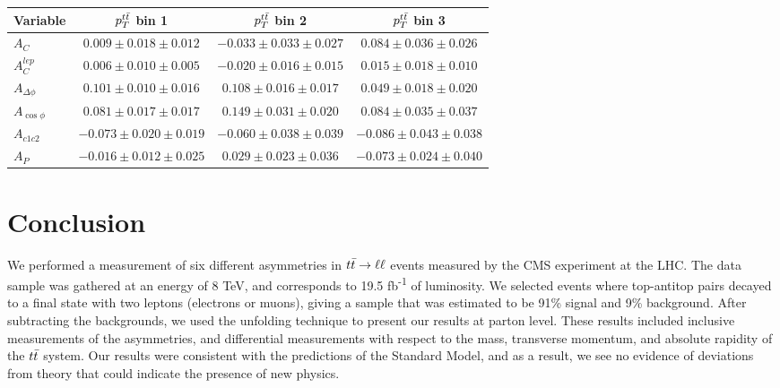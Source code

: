 \begin{table}[hbt]
\begin{center}
\begin{tabular}{l |  c  c  c }
\hline
Variable & $p_T^{t\bar{t}}$ bin 1 & $p_T^{t\bar{t}}$ bin 2 & $p_T^{t\bar{t}}$ bin 3  \\ \hline
$A_{C}$  & $0.009 \pm 0.018 \pm 0.012$   & $-0.033 \pm 0.033 \pm 0.027$   & $0.084 \pm 0.036 \pm 0.026$  \\
$A^{lep}_{C}$  & $0.006 \pm 0.010 \pm 0.005$   & $-0.020 \pm 0.016 \pm 0.015$   & $0.015 \pm 0.018 \pm 0.010$  \\
$A_{\Delta\phi}$  & $0.101 \pm 0.010 \pm 0.016$   & $0.108 \pm 0.016 \pm 0.017$   & $0.049 \pm 0.018 \pm 0.020$  \\
$A_{\cos\phi}$  & $0.081 \pm 0.017 \pm 0.017$   & $0.149 \pm 0.031 \pm 0.020$   & $0.084 \pm 0.035 \pm 0.037$  \\
$A_{c1c2}$  & $-0.073 \pm 0.020 \pm 0.019$   & $-0.060 \pm 0.038 \pm 0.039$   & $-0.086 \pm 0.043 \pm 0.038$  \\
$A_{P}$  & $-0.016 \pm 0.012 \pm 0.025$   & $0.029 \pm 0.023 \pm 0.036$   & $-0.073 \pm 0.024 \pm 0.040$  \\
 \hline
\end{tabular}
\end{center}
\end{table}




\section{Conclusion}
\label{sec:afb:conclusion}

We performed a measurement of six different asymmetries in $t\bar{t} \rightarrow \ell\ell$
events measured by the CMS experiment at the LHC. The data sample was
gathered at an energy of 8 TeV, and corresponds to 19.5
fb\textsuperscript{-1} of luminosity. We selected events where
top-antitop pairs decayed to a final state with two leptons (electrons
or muons), giving a sample that was estimated to be 91\%
signal and 9\% background. After subtracting the backgrounds, we used
the unfolding technique to present our results at parton level. These
results included inclusive measurements of the asymmetries, and
differential measurements with respect to the mass, transverse
momentum, and absolute rapidity of the $t\bar{t}$ system. Our results
were consistent with the predictions of the Standard Model, and as a
result, we see no evidence of deviations from theory that could
indicate the presence of new physics.

